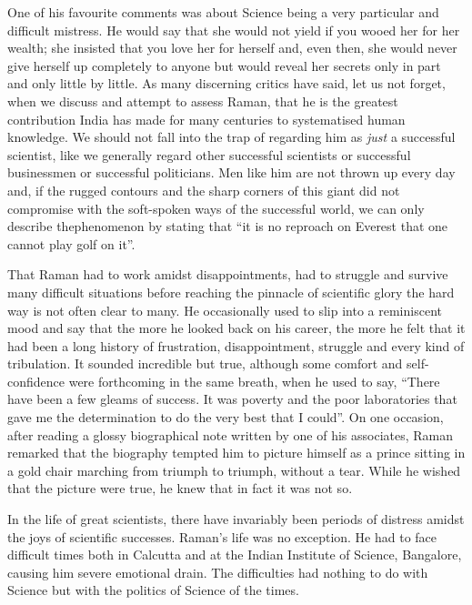 One of his favourite comments was about Science being a very particular and difficult mistress. He would say that she would not yield if you wooed her for her wealth; she insisted that you love her for herself and, even then, she would never give herself up completely to anyone but would reveal her secrets only in part and only little by little. As many discerning critics have said, let us not forget, when we discuss and attempt to assess Raman, that he is the greatest contribution India has made for many centuries to systematised human knowledge. We should not fall into the trap of regarding him as {\em just} a successful scientist, like we generally regard other successful scientists or successful businessmen or successful politicians. Men like him are not thrown up every day and, if the rugged contours and the sharp corners of this giant did not compromise with the soft-spoken ways of the successful world, we can only describe the\break phenomenon by stating that ``it is no reproach on Everest that one cannot play golf on it''.

That Raman had to work amidst disappointments, had to struggle and survive many difficult situations before reaching the pinnacle of scientific glory the hard way is not often clear to many. He occasionally used to slip into a reminiscent mood and say that the more he looked back on his career, the more he felt that it had been a long history of frustration, disappointment, struggle and every kind of tribulation. It sounded incredible but true, although some comfort and self-confidence were forthcoming in the same breath, when he used to say, ``There have been a few gleams of success. It was poverty and the poor laboratories that gave me the determination to do the very best that I could''. On one occasion, after reading a glossy biographical note written by one of his associates, Raman remarked that the biography tempted him to picture himself as a prince sitting in a gold chair marching from triumph to triumph, without a tear. While he wished that the picture were true, he knew that in fact it was not so.

In the life of great scientists, there have invariably been periods of distress amidst the joys of scientific successes. Raman's life was no exception. He had to face difficult times both in Calcutta and at the Indian Institute of Science, Bangalore, causing him severe emotional drain. The difficulties had nothing to do with Science but with the politics of Science of the times.

